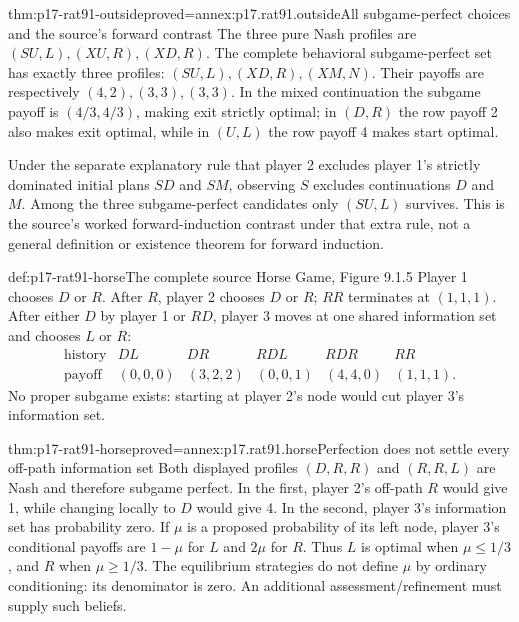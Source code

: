 \begin{hbtheorem}{thm:p17-rat91-outside}{proved=annex:p17.rat91.outside}{All subgame-perfect choices and the source's forward contrast}
The three pure Nash profiles are \((SU,L),(XU,R),(XD,R)\).
The complete behavioral subgame-perfect set has exactly three profiles:
\((SU,L),(XD,R),(XM,N)\). Their payoffs are respectively
\((4,2),(3,3),(3,3)\). In the mixed continuation the subgame
payoff is \((4/3,4/3)\), making exit strictly optimal; in \((D,R)\)
the row payoff 2 also makes exit optimal, while in \((U,L)\)
the row payoff 4 makes start optimal.

Under the separate explanatory rule that player 2 excludes player 1's
strictly dominated initial plans \(SD\) and \(SM\), observing
\(S\) excludes continuations \(D\) and \(M\). Among the three
subgame-perfect candidates only \((SU,L)\) survives. This is the
source's worked forward-induction contrast under that extra rule,
not a general definition or existence theorem for forward induction.
\end{hbtheorem}

\begin{hbdefinition}{def:p17-rat91-horse}{The complete source Horse Game, Figure 9.1.5}
Player 1 chooses \(D\) or \(R\). After \(R\), player 2 chooses
\(D\) or \(R\); \(RR\) terminates at \((1,1,1)\).
After either \(D\) by player 1 or \(RD\), player 3 moves at
one shared information set and chooses \(L\) or \(R\):
\[
\begin{array}{c|ccccc}
\text{history}&DL&DR&RDL&RDR&RR\\\hline
\text{payoff}&(0,0,0)&(3,2,2)&(0,0,1)&(4,4,0)&(1,1,1).
\end{array}
\]
No proper subgame exists: starting at player 2's node would cut
player 3's information set.
\end{hbdefinition}

\begin{hbtheorem}{thm:p17-rat91-horse}{proved=annex:p17.rat91.horse}{Perfection does not settle every off-path information set}
Both displayed profiles \((D,R,R)\) and \((R,R,L)\) are Nash
and therefore subgame perfect. In the first, player 2's off-path
\(R\) would give 1, while changing locally to \(D\) would give 4.
In the second, player 3's information set has probability zero.
If \(\mu\) is a proposed probability of its left node, player 3's
conditional payoffs are \(1-\mu\) for \(L\) and \(2\mu\)
for \(R\). Thus \(L\) is optimal when \(\mu\leq1/3\),
and \(R\) when \(\mu\geq1/3\). The equilibrium strategies
do not define \(\mu\) by ordinary conditioning: its denominator
is zero. An additional assessment/refinement must supply such beliefs.
\end{hbtheorem}

